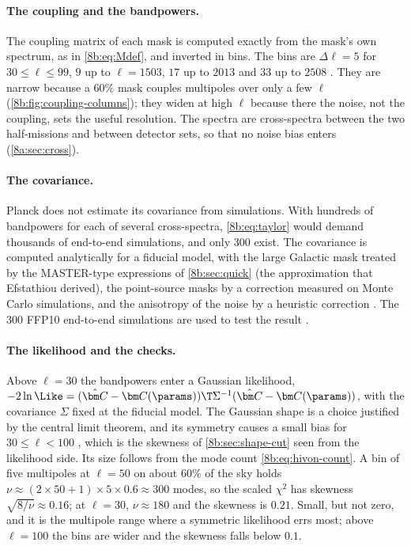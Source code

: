 \paragraph{The coupling and the bandpowers.}
The coupling matrix of each mask is computed exactly from the mask's own spectrum, as in
\eqref{8b:eq:Mdef}, and inverted in bins. The bins are $\Delta\ell=5$ for $30\le\ell\le99$, $9$ up to $\ell=1503$,
$17$ up to $2013$ and $33$ up to $2508$ \cite[§3.2.5]{Planck2018V}. They are narrow because a $60\%$
mask couples multipoles over only a few $\ell$ (\cref{8b:fig:coupling-columns}); they widen at high $\ell$
because there the noise, not the coupling, sets the useful resolution. The spectra are cross-spectra
between the two half-missions and between detector sets, so that no noise bias enters
(\cref{8a:sec:cross}).

\paragraph{The covariance.}
Planck does not estimate its covariance from simulations. With hundreds of bandpowers for each of
several cross-spectra, \eqref{8b:eq:taylor} would demand thousands of end-to-end simulations, and only
$300$ exist. The covariance is computed analytically for a fiducial model, with the large Galactic
mask treated by the MASTER-type expressions of \cref{8b:sec:quick} (the approximation that Efstathiou
derived), the point-source masks by a correction measured on Monte Carlo simulations, and the
anisotropy of the noise by a heuristic correction \cite[§3.1]{Planck2018V}. The $300$ FFP10 end-to-end
simulations are used to test the result \cite{Planck2018V}.

\paragraph{The likelihood and the checks.}
Above $\ell=30$ the bandpowers enter a Gaussian likelihood, $-2\ln\Like=(\hat{\bm C}-\bm C(\params))\T\Sigma^{-1}(\hat{\bm C}-\bm C(\params))$,
with the covariance $\Sigma$ fixed at the fiducial model. The Gaussian shape is a choice justified by the
central limit theorem, and its symmetry causes a small bias for $30\le\ell<100$
\cite[§3.1]{Planck2018V}, which is the skewness of \cref{8b:sec:shape-cut} seen from the likelihood side.
Its size follows from the mode count \eqref{8b:eq:hivon-count}. A bin of five multipoles at $\ell=50$ on about
$60\%$ of the sky holds $\nu\approx(2\times50+1)\times5\times0.6\approx300$ modes, so the scaled $\chi^2$ has skewness
$\sqrt{8/\nu}\approx0.16$; at $\ell=30$, $\nu\approx180$ and the skewness is $0.21$. Small, but not zero, and it is the
multipole range where a symmetric likelihood errs most; above $\ell=100$ the bins are wider and the
skewness falls below $0.1$.

